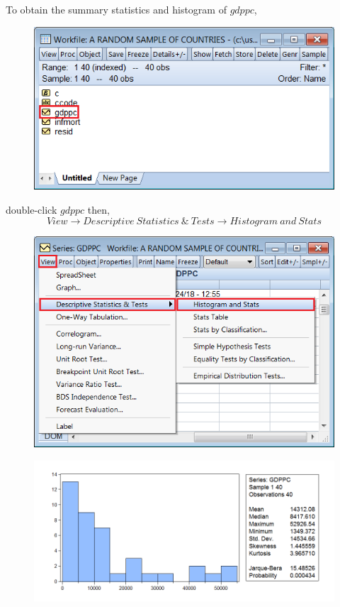 \documentclass[12pt]{report}
\begin{document}
\noindent To obtain the summary statistics and histogram of $gdppc$,
\begin{figure}[H]
	\centerline{\includegraphics{2018sem2_q1_2}}
\end{figure}
\noindent double-click $gdppc$ then, $$View \to Descriptive\ Statistics\ \&\ Tests \to Histogram\ and\ Stats$$
\begin{figure}[H]
	\centerline{\includegraphics{2018sem2_q1_3}}
\end{figure}
\begin{figure}[H]
	\centerline{\includegraphics{2018sem2_q1_4}}
\end{figure}
\end{document}
